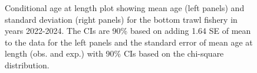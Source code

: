 \documentclass[
]{scrartcl}
\begin{document}
\begin{figure}[H]


\caption{\label{fig-call-plot-bt3}Conditional age at length plot showing
mean age (left panels) and standard deviation (right panels) for the
bottom trawl fishery in years 2022-2024. The CIs are 90\% based on
adding 1.64 SE of mean to the data for the left panels and the standard
error of mean age at length (obs. and exp.) with 90\% CIs based on the
chi-square distribution.}

\end{figure}%
\end{document}
